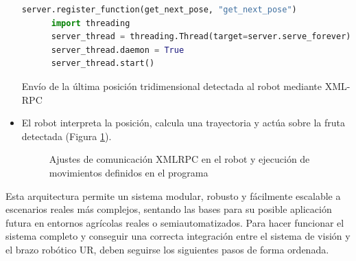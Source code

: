 \begin{itemize}
\begin{code}[H]
\begin{lstlisting}[language=Python]
      server.register_function(get_next_pose, "get_next_pose")
      import threading
      server_thread = threading.Thread(target=server.serve_forever)
      server_thread.daemon = True
      server_thread.start()
      \end{lstlisting}
      \caption{Envío de la última posición tridimensional detectada al robot mediante XML-RPC}
      \label{cod:get_next_pose}
    \end{code}          
  
  \item El robot interpreta la posición, calcula una trayectoria y actúa sobre la fruta detectada (Figura \ref{fig:Config_comunicación_UR}).
    \begin{figure}[H]
      \begin{center}
        \subcapcentertrue
        \hspace{4mm}
      \end{center}
      \caption{Ajustes de comunicación XMLRPC en el robot y ejecución de movimientos definidos en el programa}
      \label{fig:Config_comunicación_UR}
    \end{figure}
 
\end{itemize}

Esta arquitectura permite un sistema modular, robusto y fácilmente escalable a escenarios reales más complejos, sentando las bases para su posible aplicación futura en entornos agrícolas reales o semiautomatizados. Para hacer funcionar el sistema completo y conseguir una correcta integración entre el sistema de visión y el brazo robótico UR, deben seguirse los siguientes pasos de forma ordenada.

